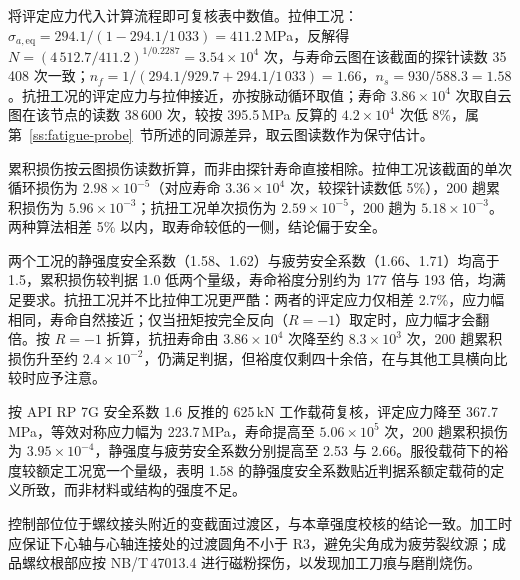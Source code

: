 将评定应力代入计算流程即可复核表中数值。拉伸工况：$\sigma_{a,\mathrm{eq}}=294.1/(1-294.1/1\,033)=411.2$\,MPa，反解得 $N=(4\,512.7/411.2)^{1/0.2287}=3.54\times10^{4}$ 次，与寿命云图在该截面的探针读数 35\,408 次一致；$n_f=1/(294.1/929.7+294.1/1\,033)=1.66$，$n_s=930/588.3=1.58$。抗扭工况的评定应力与拉伸接近，亦按脉动循环取值；寿命 $3.86\times10^{4}$ 次取自云图在该节点的读数 38\,600 次，较按 395.5\,MPa 反算的 $4.2\times10^{4}$ 次低 8\%，属第~\ref{ss:fatigue-probe}~节所述的同源差异，取云图读数作为保守估计。

累积损伤按云图损伤读数折算，而非由探针寿命直接相除。拉伸工况该截面的单次循环损伤为 $2.98\times10^{-5}$（对应寿命 $3.36\times10^{4}$ 次，较探针读数低 5\%），200 趟累积损伤为 $5.96\times10^{-3}$；抗扭工况单次损伤为 $2.59\times10^{-5}$，200 趟为 $5.18\times10^{-3}$。两种算法相差 5\% 以内，取寿命较低的一侧，结论偏于安全。

两个工况的静强度安全系数（1.58、1.62）与疲劳安全系数（1.66、1.71）均高于 1.5，累积损伤较判据 1.0 低两个量级，寿命裕度分别约为 177 倍与 193 倍，均满足要求。抗扭工况并不比拉伸工况更严酷：两者的评定应力仅相差 2.7\%，应力幅相同，寿命自然接近；仅当扭矩按完全反向（$R=-1$）取定时，应力幅才会翻倍。按 $R=-1$ 折算，抗扭寿命由 $3.86\times10^{4}$ 次降至约 $8.3\times10^{3}$ 次，200 趟累积损伤升至约 $2.4\times10^{-2}$，仍满足判据，但裕度仅剩四十余倍，在与其他工具横向比较时应予注意。

按 API RP 7G 安全系数 1.6 反推的 625\,kN 工作载荷复核，评定应力降至 367.7\,MPa，等效对称应力幅为 223.7\,MPa，寿命提高至 $5.06\times10^{5}$ 次，200 趟累积损伤为 $3.95\times10^{-4}$，静强度与疲劳安全系数分别提高至 2.53 与 2.66。服役载荷下的裕度较额定工况宽一个量级，表明 1.58 的静强度安全系数贴近判据系额定载荷的定义所致，而非材料或结构的强度不足。

控制部位位于螺纹接头附近的变截面过渡区，与本章强度校核的结论一致。加工时应保证下心轴与心轴连接处的过渡圆角不小于 R3，避免尖角成为疲劳裂纹源；成品螺纹根部应按 NB/T\,47013.4 进行磁粉探伤，以发现加工刀痕与磨削烧伤。
